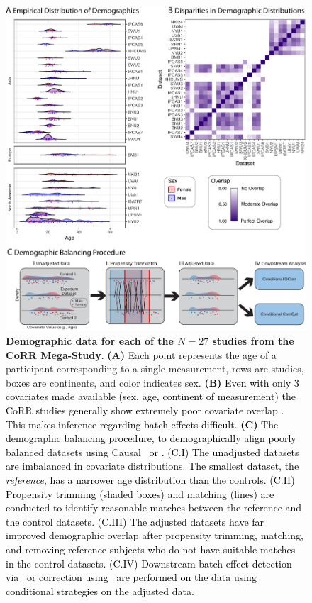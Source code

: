 \begin{figure}[!h]
    \centering
    \includegraphics[width=\linewidth]{Figures/Content/demographic.pdf}
    \caption{\textbf{Demographic data for each of the $N=27$ studies from the CoRR Mega-Study}. \textbf{(A)}  Each point represents the age of a participant corresponding to a single measurement, rows are studies, boxes are continents, and color indicates sex. 
    \textcolor{black}{\textbf{(B)} Even with only $3$ covariates made available (sex, age, continent of measurement) the CoRR studies generally show extremely poor covariate overlap \cite{Pastore2019}. This makes inference regarding batch effects difficult. \textbf{(C)} The demographic balancing procedure, to demographically align poorly balanced datasets using Causal \Dcorr~or \cccombat. (C.I) The unadjusted datasets are imbalanced in covariate distributions. The smallest dataset, the \textit{reference}, has a narrower age distribution than the controls. (C.II) Propensity trimming (shaded boxes) and matching (lines) are conducted to identify reasonable matches between the reference and the control datasets. (C.III) The adjusted datasets have far improved demographic overlap after propensity trimming, matching, and removing reference subjects who do not have suitable matches in the control datasets. (C.IV) Downstream batch effect detection via \Dcorr~or correction using \Combat~are performed on the data using conditional strategies on the adjusted data.}}
    \label{fig:demographic}
\end{figure}

